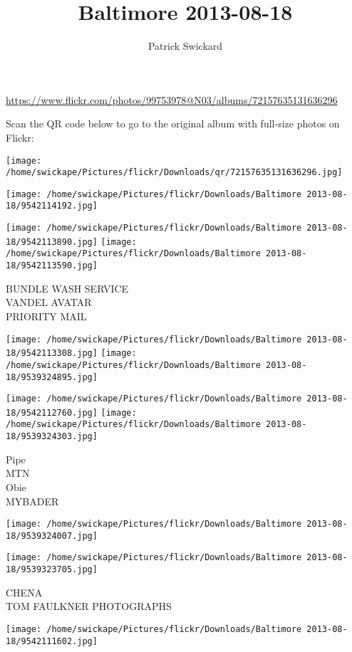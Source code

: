 \documentclass[10pt,letterpaper]{article}
\title{Baltimore 2013-08-18}
\author{Patrick Swickard}
\date{}
\begin{document}
\maketitle

\url{https://www.flickr.com/photos/99753978@N03/albums/72157635131636296}

Scan the QR code below to go to the original album with full-size photos on Flickr:

\texttt{[image: /home/swickape/Pictures/flickr/Downloads/qr/72157635131636296.jpg]}
\pagebreak

\texttt{[image: /home/swickape/Pictures/flickr/Downloads/Baltimore 2013-08-18/9542114192.jpg]}

\vspace{0.25in}
\texttt{[image: /home/swickape/Pictures/flickr/Downloads/Baltimore 2013-08-18/9542113890.jpg]}
\texttt{[image: /home/swickape/Pictures/flickr/Downloads/Baltimore 2013-08-18/9542113590.jpg]}

BUNDLE WASH SERVICE\\
VANDEL AVATAR\\
PRIORITY MAIL
\pagebreak

\texttt{[image: /home/swickape/Pictures/flickr/Downloads/Baltimore 2013-08-18/9542113308.jpg]}
\texttt{[image: /home/swickape/Pictures/flickr/Downloads/Baltimore 2013-08-18/9539324895.jpg]}

\texttt{[image: /home/swickape/Pictures/flickr/Downloads/Baltimore 2013-08-18/9542112760.jpg]}
\texttt{[image: /home/swickape/Pictures/flickr/Downloads/Baltimore 2013-08-18/9539324303.jpg]}

Pipe\\
MTN\\
Obie\\
MYBADER
\pagebreak

\texttt{[image: /home/swickape/Pictures/flickr/Downloads/Baltimore 2013-08-18/9539324007.jpg]}

\vspace{0.25in}
\texttt{[image: /home/swickape/Pictures/flickr/Downloads/Baltimore 2013-08-18/9539323705.jpg]}

CHENA\\
TOM FAULKNER PHOTOGRAPHS
\pagebreak

\texttt{[image: /home/swickape/Pictures/flickr/Downloads/Baltimore 2013-08-18/9542111602.jpg]}
\end{document}
